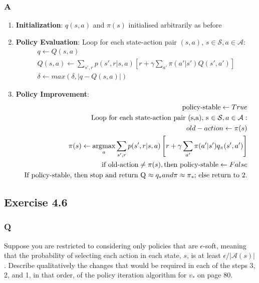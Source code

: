 \subsubsection{A}
\begin{enumerate}
	\item \textbf{Initialization}: $q(s,a)$ and $\pi(s)$ initialised arbitrarily as before
	\item \textbf{Policy Evaluation}: Loop for each state-action pair $(s,a)$, $s \in \mathcal{S}, a \in \mathcal{A}$:\\
	\begin{equation}
	\begin{aligned}
		q \leftarrow Q(s,a) \\
		Q(s,a) \leftarrow \sum_{s',r} p(s', r | s, a) \left[r + \gamma \sum_{a'} \pi(a' | s') Q(s', a')\right] \\
		\delta \leftarrow max(\delta, |q - Q(s,a)|)
	\end{aligned}
	\end{equation}
	\item \textbf{Policy Improvement}: \\
	\begin{equation}
	\begin{aligned}
		\text{policy-stable} \leftarrow True \\
		\text{Loop for each state-action pair (s,a), s $\in \mathcal{S}, a \in \mathcal{A}$}:\\
		old-action \leftarrow \pi(s)\\
		\pi(s) \leftarrow \operatorname*{\arg\!\max}_a \sum_{s',r} p(s', r | s, a) \left[r + \gamma \sum_{a'} \pi(a' | s') q_\pi(s', a')\right] \\
		\text{if old-action} \neq \pi(s), \text{then policy-stable} \leftarrow False \\
		\text{If policy-stable, then stop and return Q $\approx q_* and \pi \approx \pi_*$; else return to 2.} \\
	\end{aligned}
	\end{equation}
\end{enumerate}

\subsection*{Exercise 4.6}
\subsubsection{Q}
Suppose you are restricted to considering only policies that are $\epsilon$-soft, meaning that the probability of selecting each action in each state, $s$, is at least $\epsilon /|\mathcal{A}(s)|$. Describe qualitatively the changes that would be required in each of the steps 3, 2, and 1, in that order, of the policy iteration algorithm for $v_*$ on page 80.
